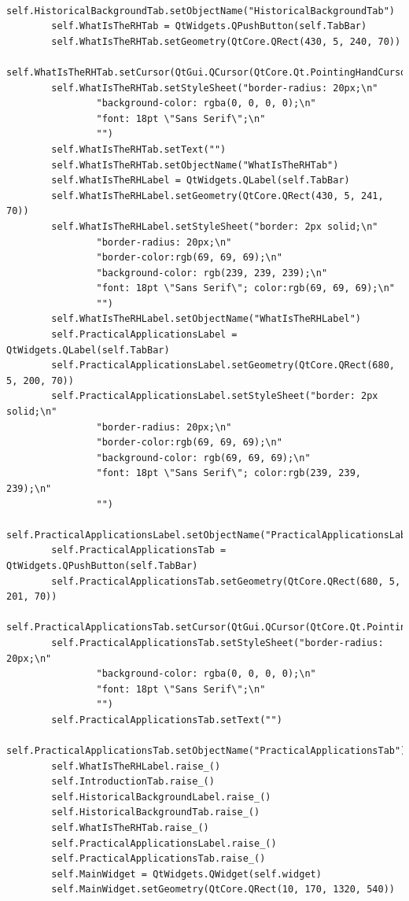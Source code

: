 \documentclass[12pt]{article}
\begin{document}
\begin{lstlisting}
        self.HistoricalBackgroundTab.setObjectName("HistoricalBackgroundTab")
        self.WhatIsTheRHTab = QtWidgets.QPushButton(self.TabBar)
        self.WhatIsTheRHTab.setGeometry(QtCore.QRect(430, 5, 240, 70))
        self.WhatIsTheRHTab.setCursor(QtGui.QCursor(QtCore.Qt.PointingHandCursor))
        self.WhatIsTheRHTab.setStyleSheet("border-radius: 20px;\n"
                "background-color: rgba(0, 0, 0, 0);\n"
                "font: 18pt \"Sans Serif\";\n"
                "")
        self.WhatIsTheRHTab.setText("")
        self.WhatIsTheRHTab.setObjectName("WhatIsTheRHTab")
        self.WhatIsTheRHLabel = QtWidgets.QLabel(self.TabBar)
        self.WhatIsTheRHLabel.setGeometry(QtCore.QRect(430, 5, 241, 70))
        self.WhatIsTheRHLabel.setStyleSheet("border: 2px solid;\n"
                "border-radius: 20px;\n"
                "border-color:rgb(69, 69, 69);\n"
                "background-color: rgb(239, 239, 239);\n"
                "font: 18pt \"Sans Serif\"; color:rgb(69, 69, 69);\n"
                "")
        self.WhatIsTheRHLabel.setObjectName("WhatIsTheRHLabel")
        self.PracticalApplicationsLabel = QtWidgets.QLabel(self.TabBar)
        self.PracticalApplicationsLabel.setGeometry(QtCore.QRect(680, 5, 200, 70))
        self.PracticalApplicationsLabel.setStyleSheet("border: 2px solid;\n"
                "border-radius: 20px;\n"
                "border-color:rgb(69, 69, 69);\n"
                "background-color: rgb(69, 69, 69);\n"
                "font: 18pt \"Sans Serif\"; color:rgb(239, 239, 239);\n"
                "")
        self.PracticalApplicationsLabel.setObjectName("PracticalApplicationsLabel")
        self.PracticalApplicationsTab = QtWidgets.QPushButton(self.TabBar)
        self.PracticalApplicationsTab.setGeometry(QtCore.QRect(680, 5, 201, 70))
        self.PracticalApplicationsTab.setCursor(QtGui.QCursor(QtCore.Qt.PointingHandCursor))
        self.PracticalApplicationsTab.setStyleSheet("border-radius: 20px;\n"
                "background-color: rgba(0, 0, 0, 0);\n"
                "font: 18pt \"Sans Serif\";\n"
                "")
        self.PracticalApplicationsTab.setText("")
        self.PracticalApplicationsTab.setObjectName("PracticalApplicationsTab")
        self.WhatIsTheRHLabel.raise_()
        self.IntroductionTab.raise_()
        self.HistoricalBackgroundLabel.raise_()
        self.HistoricalBackgroundTab.raise_()
        self.WhatIsTheRHTab.raise_()
        self.PracticalApplicationsLabel.raise_()
        self.PracticalApplicationsTab.raise_()
        self.MainWidget = QtWidgets.QWidget(self.widget)
        self.MainWidget.setGeometry(QtCore.QRect(10, 170, 1320, 540))

\end{lstlisting}
\end{document}
